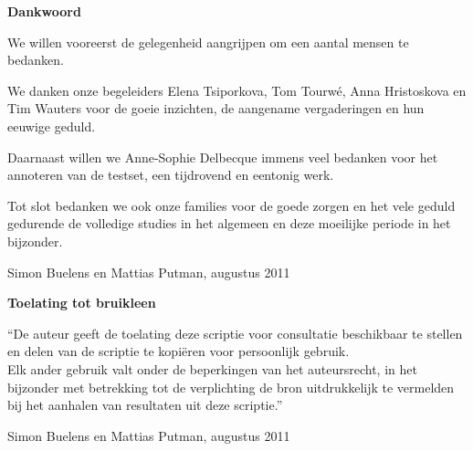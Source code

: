 
\newpage

\noindent \textbf{\huge Dankwoord}

We willen vooreerst de gelegenheid aangrijpen om een aantal mensen te bedanken. 

We danken onze begeleiders Elena Tsiporkova, Tom Tourw\'e, Anna Hristoskova en Tim Wauters voor de goeie inzichten, de aangename vergaderingen en hun eeuwige geduld.

Daarnaast willen we Anne-Sophie Delbecque immens veel bedanken voor het annoteren van de testset, een tijdrovend en eentonig werk.

Tot slot bedanken we ook onze families voor de goede zorgen en het vele geduld gedurende de volledige studies in het algemeen en deze moeilijke periode in het bijzonder.

\vspace{1.5cm}

\noindent

\addvspace{4cm}

\noindent Simon Buelens en Mattias Putman, augustus 2011\newpage

\noindent \textbf{\huge Toelating tot bruikleen}

\vspace{1.5cm}

\noindent
``De auteur geeft de toelating deze scriptie voor consultatie beschikbaar
te stellen en delen van de scriptie te kopi\"eren voor persoonlijk
gebruik.\\
Elk ander gebruik valt onder de beperkingen van het auteursrecht,
in het bijzonder met betrekking tot de verplichting de bron uitdrukkelijk
te vermelden bij het aanhalen van resultaten uit deze scriptie.''

\addvspace{4cm}

\noindent Simon Buelens en Mattias Putman, augustus 2011\newpage
